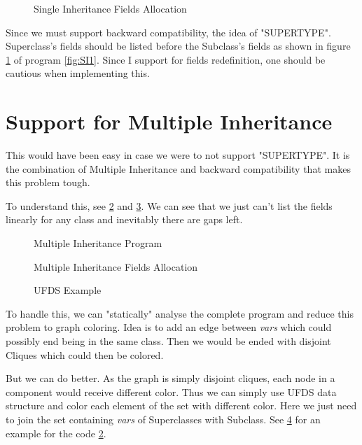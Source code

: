 \begin{figure}
	\centering
	\caption{Single Inheritance Fields Allocation}
	\label{fig:SI2}
\end{figure}

Since we must support backward compatibility, the idea of "SUPERTYPE". Superclass's fields should be listed before the Subclass's fields as shown in figure \ref{fig:SI2} of program \ref{fig:SI1}. Since I support for fields redefinition, one should be cautious when implementing this.

\section{Support for Multiple Inheritance}

This would have been easy in case we were to not support "SUPERTYPE". It is the combination of Multiple Inheritance and backward compatibility that makes this problem tough.

To understand this, see \ref{fig:MI1} and \ref{fig:MI2}. We can see that we just can't list the fields linearly for any class and inevitably there are gaps left.

\begin{figure}
	\centering
	\caption{Multiple Inheritance Program}
	\label{fig:MI1}
\end{figure}

\begin{figure}
	\centering
	\caption{Multiple Inheritance Fields Allocation}
	\label{fig:MI2}
\end{figure}

\begin{figure}
	\centering
	\caption{UFDS Example}
	\label{fig:MI3}
\end{figure}

To handle this, we can "statically" analyse the complete program and reduce this problem to graph coloring. Idea is to add an edge between \textit{vars} which could possibly end being in the same class. Then we would be ended with disjoint Cliques which could then be colored.

But we can do better. As the graph is simply disjoint cliques, each node in a component would receive different color. Thus we can simply use UFDS data structure and color each element of the set with different color. Here we just need to join the set containing \textit{vars} of Superclasses with Subclass. See \ref{fig:MI3} for an example for the code \ref{fig:MI1}.

